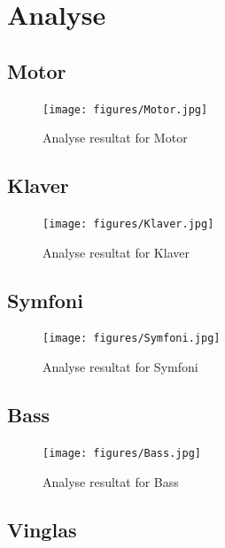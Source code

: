 \chapter{Analyse}\label{ch:analyse}



\section{Motor}

\begin{figure}[ht!]
	\centering
	\texttt{[image: figures/Motor.jpg]}
	\caption{Analyse resultat for Motor}
	\label{fig:Motor}
\end{figure}

\section{Klaver}

\begin{figure}[ht!]
	\centering
	\texttt{[image: figures/Klaver.jpg]}
	\caption{Analyse resultat for Klaver}
	\label{fig:Klaver}
\end{figure}

\section{Symfoni}

\begin{figure}[ht!]
	\centering
	\texttt{[image: figures/Symfoni.jpg]}
	\caption{Analyse resultat for Symfoni}
	\label{fig:Symfoni}
\end{figure}

\section{Bass}

\begin{figure}[ht!]
	\centering
	\texttt{[image: figures/Bass.jpg]}
	\caption{Analyse resultat for Bass}
	\label{fig:Bass}
\end{figure}

\section{Vinglas}

